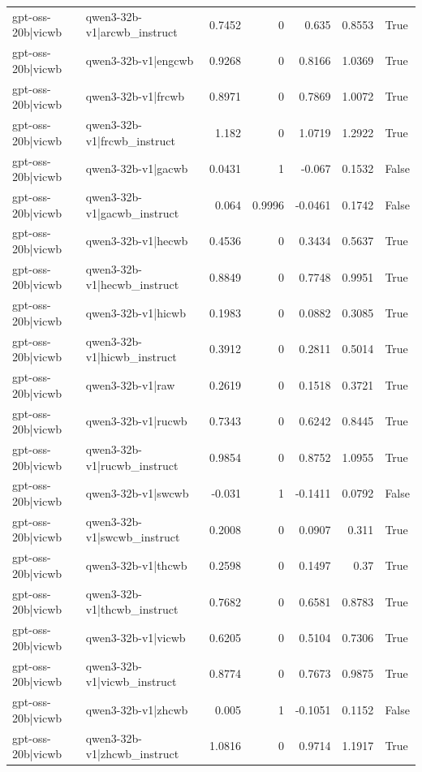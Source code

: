 \begin{table}
\begin{tabular}{l l r r r r l}
gpt-oss-20b|vicwb & qwen3-32b-v1|arcwb_instruct & 0.7452 & 0 & 0.635 & 0.8553 & True \\
gpt-oss-20b|vicwb & qwen3-32b-v1|engcwb & 0.9268 & 0 & 0.8166 & 1.0369 & True \\
gpt-oss-20b|vicwb & qwen3-32b-v1|frcwb & 0.8971 & 0 & 0.7869 & 1.0072 & True \\
gpt-oss-20b|vicwb & qwen3-32b-v1|frcwb_instruct & 1.182 & 0 & 1.0719 & 1.2922 & True \\
gpt-oss-20b|vicwb & qwen3-32b-v1|gacwb & 0.0431 & 1 & -0.067 & 0.1532 & False \\
gpt-oss-20b|vicwb & qwen3-32b-v1|gacwb_instruct & 0.064 & 0.9996 & -0.0461 & 0.1742 & False \\
gpt-oss-20b|vicwb & qwen3-32b-v1|hecwb & 0.4536 & 0 & 0.3434 & 0.5637 & True \\
gpt-oss-20b|vicwb & qwen3-32b-v1|hecwb_instruct & 0.8849 & 0 & 0.7748 & 0.9951 & True \\
gpt-oss-20b|vicwb & qwen3-32b-v1|hicwb & 0.1983 & 0 & 0.0882 & 0.3085 & True \\
gpt-oss-20b|vicwb & qwen3-32b-v1|hicwb_instruct & 0.3912 & 0 & 0.2811 & 0.5014 & True \\
gpt-oss-20b|vicwb & qwen3-32b-v1|raw & 0.2619 & 0 & 0.1518 & 0.3721 & True \\
gpt-oss-20b|vicwb & qwen3-32b-v1|rucwb & 0.7343 & 0 & 0.6242 & 0.8445 & True \\
gpt-oss-20b|vicwb & qwen3-32b-v1|rucwb_instruct & 0.9854 & 0 & 0.8752 & 1.0955 & True \\
gpt-oss-20b|vicwb & qwen3-32b-v1|swcwb & -0.031 & 1 & -0.1411 & 0.0792 & False \\
gpt-oss-20b|vicwb & qwen3-32b-v1|swcwb_instruct & 0.2008 & 0 & 0.0907 & 0.311 & True \\
gpt-oss-20b|vicwb & qwen3-32b-v1|thcwb & 0.2598 & 0 & 0.1497 & 0.37 & True \\
gpt-oss-20b|vicwb & qwen3-32b-v1|thcwb_instruct & 0.7682 & 0 & 0.6581 & 0.8783 & True \\
gpt-oss-20b|vicwb & qwen3-32b-v1|vicwb & 0.6205 & 0 & 0.5104 & 0.7306 & True \\
gpt-oss-20b|vicwb & qwen3-32b-v1|vicwb_instruct & 0.8774 & 0 & 0.7673 & 0.9875 & True \\
gpt-oss-20b|vicwb & qwen3-32b-v1|zhcwb & 0.005 & 1 & -0.1051 & 0.1152 & False \\
gpt-oss-20b|vicwb & qwen3-32b-v1|zhcwb_instruct & 1.0816 & 0 & 0.9714 & 1.1917 & True \\

\end{tabular}
\end{table}
